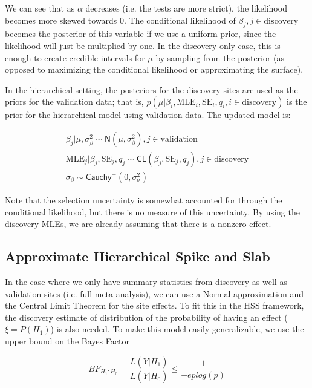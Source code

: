 \documentclass[AMA,STIX1COL]{WileyNJD-v2}\usepackage[]{graphicx}\usepackage[]{color}
\begin{document}
We can see that as $\alpha$ decreases (i.e. the tests are more strict), the likelihood becomes more skewed towards 0. The conditional likelihood of $\beta_{ j}, j\in \text{discovery}$ becomes the posterior of this variable if we use a uniform prior, since the likelihood will just be multiplied by one. In the discovery-only case, this is enough to create credible intervals for $\mu$ by sampling from the posterior (as opposed to maximizing the conditional likelihood or approximating the surface).


In the hierarchical setting, the posteriors for the discovery sites are used as the priors for the validation data; that is, $p(\mu| \beta_i, \text{MLE}_i,\text{SE}_i, q_i, i \in  \text{discovery})$ is the prior for the hierarchical model using validation data. The updated model is:

\begin{gather} \label{eq6}
\beta_{j}|\mu, \sigma_{\beta}^{2} \sim \textsf{N}(\mu, \sigma_{\beta}^{2}) , j \in \text{validation}\\
\text{MLE}_{j}|\beta_{j},\text{SE}_{j}, q_j \sim \textsf{CL}(\beta_{j},\text{SE}_{j}, q_j) , j \in \text{discovery}\\
\sigma_{\beta}\sim \textsf{Cauchy}^+(0,\sigma^2_{\sigma})
\end{gather}

Note that the selection uncertainty is somewhat accounted for through the conditional likelihood, but there is no measure of this uncertainty. By using the discovery MLEs, we are already assuming that there is a nonzero effect.


\subsection{Approximate Hierarchical Spike and Slab}

In the case where we only have summary statistics from discovery as well as validation sites (i.e. full meta-analysis), we can use a Normal approximation and the Central Limit Theorem for the site effects. To fit this in the HSS framework, the discovery estimate of distribution of the probability of having an effect ($\xi = P(H_1)$) is also needed. To make this model easily generalizable, we use the upper bound on the Bayes Factor

\begin{equation}\label{eq7}
BF_{H_1:H_0} = \frac{L(\bar Y | H_1)}{L(\bar Y | H_0)} \leq \frac{1}{-e p log(p)}
\end{equation}
\end{document}
